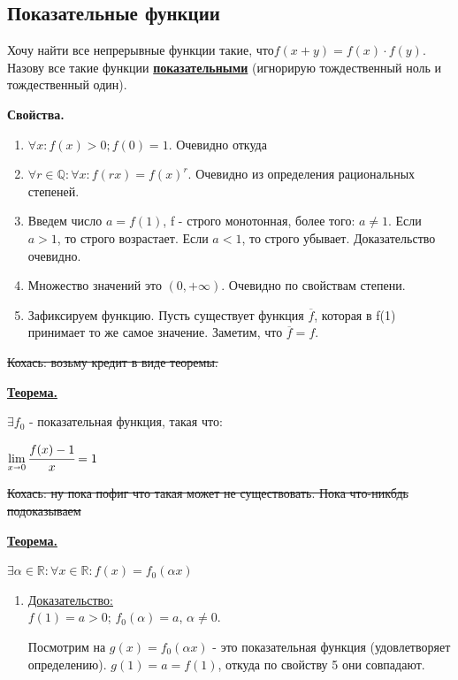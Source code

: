 \documentclass{article}
\newcommand{\deff}[1]{\underline{\textbf{#1}}}
\newcommand{\thmm}[1]{\underline{\textbf{#1}}}
\newcommand{\prooff}[1]{{\underline{Доказательство:}} \\ }
\begin{document}
\pagebreak
\subsection{Показательные функции}

Хочу найти все непрерывные функции такие, что$f(x+y) = f(x) \cdot f(y) $. Назову все такие функции \deff{показательными} (игнорирую тождественный ноль и тождественный один).

\textbf{Свойства.}

\begin{enumerate}
    \item $\forall x: f(x) > 0; f(0) = 1$. Очевидно откуда
    \item $\forall r \in \mathbb{Q}: \forall x: f(rx) = f(x)^r$. Очевидно из определения рациональных степеней.
    \item Введем число $a=f(1)$,  f - строго монотонная, более того: $a\neq 1$. Если $a>1$,  то строго возрастает. Если $a<1$, то строго убывает. Доказательство очевидно.
    \item Множество значений это $(0,+\infty)$. Очевидно по свойствам степени.  
    \item Зафиксируем функцию. Пусть существует функция $\overline{f}$, которая в f(1) принимает то же самое значение. Заметим, что $\overline{f}=f$.
\end{enumerate}
    


\sout{Кохась: возьму кредит в виде теоремы.}

\thmm{Теорема.}

$\exists f_0$ - показательная  функция, такая что:

$\lim\limits_{x \shortrightarrow 0} \cfrac{f(x)-1}{x}=1$

\sout{Кохась: ну пока пофиг что такая может не  существовать. Пока что-никбдь подоказываем }

\thmm{Теорема.}

$\exists \alpha \in \mathbb{R}: \forall x \in \mathbb{R}: f(x)=f_0(\alpha x)$


\begin{enumerate}
    \item[] \prooff{}
     $f(1) = a > 0$; $f_0(\alpha) = a$, $\alpha \neq 0$.

     Посмотрим на $g(x) = f_0(\alpha x)$ -  это показательная функция (удовлетворяет определению). $g(1) = a = f(1)$, откуда по свойству 5 они совпадают. 
\end{enumerate}
\end{document}
